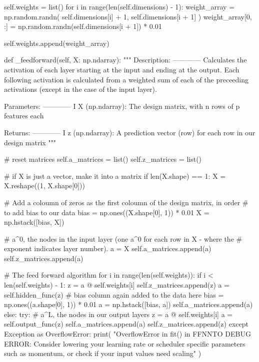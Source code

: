 \documentclass[%
oneside,                 %
final,                   %
10pt]{article}
\begin{document}
        self.weights = list()
        for i in range(len(self.dimensions) - 1):
            weight_array = np.random.randn(
                self.dimensions[i] + 1, self.dimensions[i + 1]
            )
            weight_array[0, :] = np.random.randn(self.dimensions[i + 1]) * 0.01

            self.weights.append(weight_array)

    def _feedforward(self, X: np.ndarray):
        """
        Description:
        ------------
            Calculates the activation of each layer starting at the input and ending at the output.
            Each following activation is calculated from a weighted sum of each of the preceeding
            activations (except in the case of the input layer).

        Parameters:
        ------------
            I   X (np.ndarray): The design matrix, with n rows of p features each

        Returns:
        ------------
            I   z (np.ndarray): A prediction vector (row) for each row in our design matrix
        """

        # reset matrices
        self.a_matrices = list()
        self.z_matrices = list()

        # if X is just a vector, make it into a matrix
        if len(X.shape) == 1:
            X = X.reshape((1, X.shape[0]))

        # Add a coloumn of zeros as the first coloumn of the design matrix, in order
        # to add bias to our data
        bias = np.ones((X.shape[0], 1)) * 0.01
        X = np.hstack([bias, X])

        # a^0, the nodes in the input layer (one a^0 for each row in X - where the
        # exponent indicates layer number).
        a = X
        self.a_matrices.append(a)
        self.z_matrices.append(a)

        # The feed forward algorithm
        for i in range(len(self.weights)):
            if i < len(self.weights) - 1:
                z = a @ self.weights[i]
                self.z_matrices.append(z)
                a = self.hidden_func(z)
                # bias column again added to the data here
                bias = np.ones((a.shape[0], 1)) * 0.01
                a = np.hstack([bias, a])
                self.a_matrices.append(a)
            else:
                try:
                    # a^L, the nodes in our output layers
                    z = a @ self.weights[i]
                    a = self.output_func(z)
                    self.a_matrices.append(a)
                    self.z_matrices.append(z)
                except Exception as OverflowError:
                    print(
                        "OverflowError in fit() in FFNN\nHOW TO DEBUG ERROR: Consider lowering your learning rate or scheduler specific parameters such as momentum, or check if your input values need scaling"
                    )
\end{document}
